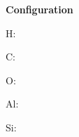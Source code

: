 \documentclass[11pt]{article}
\begin{document}
{\bfseries Configuration}

H:  \par
C:  \par
O:  \par
Al:  \par
Si:  \par
\end{document}
